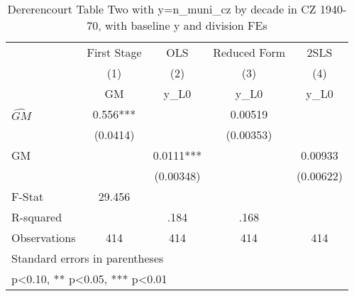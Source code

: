 \begin{table}[htbp]\centering
\def\sym#1{\ifmmode^{#1}\else\(^{#1}\)\fi}
\caption{Dererencourt Table Two with y=n\_muni\_cz by decade in CZ 1940-70, with baseline y and division FEs}
\begin{tabular}{l*{4}{c}}
\toprule
                    & First Stage   &         OLS   &Reduced Form   &        2SLS   \\
                    &\multicolumn{1}{c}{(1)}&\multicolumn{1}{c}{(2)}&\multicolumn{1}{c}{(3)}&\multicolumn{1}{c}{(4)}\\
                    &\multicolumn{1}{c}{GM}&\multicolumn{1}{c}{y\_L0}&\multicolumn{1}{c}{y\_L0}&\multicolumn{1}{c}{y\_L0}\\
\midrule
$\hat{GM}$          &       0.556***&               &     0.00519   &               \\
                    &    (0.0414)   &               &   (0.00353)   &               \\
\addlinespace
GM                  &               &      0.0111***&               &     0.00933   \\
                    &               &   (0.00348)   &               &   (0.00622)   \\
\midrule
F-Stat              &      29.456   &               &               &               \\
R-squared           &               &        .184   &        .168   &               \\
Observations        &         414   &         414   &         414   &         414   \\
\bottomrule
\multicolumn{5}{l}{\footnotesize Standard errors in parentheses}\\
\multicolumn{5}{l}{\footnotesize * p<0.10, ** p<0.05, *** p<0.01}\\
\end{tabular}
\end{table}
